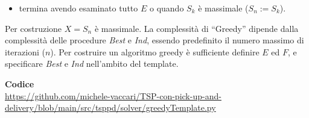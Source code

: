 \documentclass[9pt]{beamer}
\begin{document}
\begin{frame}[allowframebreaks]{\subsecname}
\begin{itemize}
	\item
	termina avendo esaminato tutto $E$ o quando $S_k$ è massimale ($S_n := S_k$). 
	
	\end{itemize}
	
	Per costruzione $X=S_n$  è massimale. 	La complessità di “Greedy” dipende dalla complessità delle procedure \emph{Best} e \emph{Ind}, essendo predefinito il numero massimo di iterazioni ($n$). Per costruire un algoritmo greedy è sufficiente definire $E$ ed $F$, e specificare \emph{Best} e \emph{Ind} nell’ambito del template.

	\textbf{Codice} \\
	\href{https://github.com/michele-vaccari/TSP-con-pick-up-and-delivery/blob/main/src/tsppd/solver/greedyTemplate.py}{https://github.com/michele-vaccari/TSP-con-pick-up-and-delivery/blob/main/src/tsppd/solver/greedyTemplate.py}
\end{frame}
\end{document}
